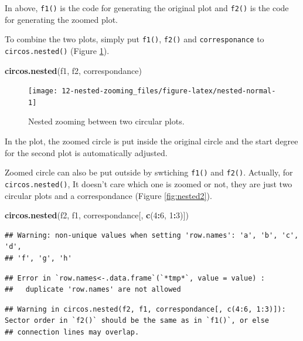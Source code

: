 \documentclass[]{book}
\newenvironment{Shaded}{\begin{snugshade}}{\end{snugshade}}
\newcommand{\KeywordTok}[1]{\textcolor[rgb]{0.13,0.29,0.53}{\textbf{#1}}}
\newcommand{\DecValTok}[1]{\textcolor[rgb]{0.00,0.00,0.81}{#1}}
\newcommand{\OperatorTok}[1]{\textcolor[rgb]{0.81,0.36,0.00}{\textbf{#1}}}
\newcommand{\NormalTok}[1]{#1}
\begin{document}
In above, \texttt{f1()} is the code for generating the original plot and
\texttt{f2()} is the code for generating the zoomed plot.

To combine the two plots, simply put \texttt{f1()}, \texttt{f2()} and
\texttt{corresponance} to \texttt{circos.nested()} (Figure
\ref{fig:nested-normal}).

\begin{Shaded}
\begin{Highlighting}[]
\KeywordTok{circos.nested}\NormalTok{(f1, f2, correspondance)}
\end{Highlighting}
\end{Shaded}

\begin{figure}

{\centering \texttt{[image: 12-nested-zooming\_files/figure-latex/nested-normal-1]} 

}

\caption{Nested zooming between two circular plots.}\label{fig:nested-normal}
\end{figure}

In the plot, the zoomed circle is put inside the original circle and the
start degree for the second plot is automatically adjusted.

Zoomed circle can also be put outside by swtiching \texttt{f1()} and
\texttt{f2()}. Actually, for \texttt{circos.nested()}, It doesn't care
which one is zoomed or not, they are just two circular plots and a
correspondance (Figure \ref{fig:nested2}).

\begin{Shaded}
\begin{Highlighting}[]
\KeywordTok{circos.nested}\NormalTok{(f2, f1, correspondance[, }\KeywordTok{c}\NormalTok{(}\DecValTok{4}\OperatorTok{:}\DecValTok{6}\NormalTok{, }\DecValTok{1}\OperatorTok{:}\DecValTok{3}\NormalTok{)])}
\end{Highlighting}
\end{Shaded}

\begin{verbatim}
## Warning: non-unique values when setting 'row.names': 'a', 'b', 'c', 'd',
## 'f', 'g', 'h'
\end{verbatim}

\begin{verbatim}
## Error in `row.names<-.data.frame`(`*tmp*`, value = value) : 
##   duplicate 'row.names' are not allowed
\end{verbatim}

\begin{verbatim}
## Warning in circos.nested(f2, f1, correspondance[, c(4:6, 1:3)]): Sector order in `f2()` should be the same as in `f1()`, or else
## connection lines may overlap.
\end{verbatim}
\end{document}
